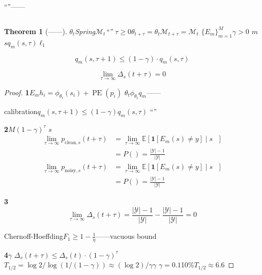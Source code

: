 \documentclass[11pt,a4paper]{article}
\newtheorem{theorem}{Theorem}[section]
\theoremstyle{remark}
\DeclareMathOperator{\PE}{PE}
\newcommand{\Y}{\mathcal{Y}}
\newcommand{\E}{\mathbb{E}}
\begin{document}
``''——


\subsection{}

\begin{theorem}[——]
\label{thm:economy}
$\theta_t$Spring$\mathcal{M}_t$``''
$\tau \geq 0$$\theta_{t+\tau} = \theta_t$$\mathcal{M}_{t+\tau} = \mathcal{M}_t$
$\{E_m\}_{m=1}^M$\textbf{}$\gamma > 0$
$m$$s$$q_m(s, \tau)$$\ell_1$

\begin{equation}
    q_m(s, \tau+1) \leq (1 - \gamma) \cdot q_m(s, \tau)
\end{equation}

\begin{equation}
    \boxed{
    \lim_{\tau \to \infty} \Delta_s(t + \tau) = 0
    }
\end{equation}
\end{theorem}

\begin{proof}
\textbf{1}$E_m$$h_i = \phi_{\theta_t}(s_i) + \PE(p_i)$
$\theta_t$$\phi_{\theta_t}$$q_m$——

calibration$q_m(s, \tau+1) \leq (1-\gamma)q_m(s,\tau)$
``''

\textbf{2}$M$$(1-\gamma)^\tau$
\textbf{}$s$
\begin{align}
    \lim_{\tau \to \infty} p_{\text{clean},s}(t+\tau)
    &= \lim_{\tau \to \infty} \E[\mathbf{1}[E_m(s) \neq y] \mid s \text{ }] \nonumber\\
    &= P(\text{}) = \frac{|\Y| - 1}{|\Y|}\\
    \lim_{\tau \to \infty} p_{\text{noisy},s}(t+\tau)
    &= \lim_{\tau \to \infty} \E[\mathbf{1}[E_m(s) \neq y] \mid s \text{ }] \nonumber\\
    &= P(\text{}) = \frac{|\Y| - 1}{|\Y|}
\end{align}

\textbf{3}
\begin{equation}
    \lim_{\tau \to \infty} \Delta_s(t+\tau)
    = \frac{|\Y| - 1}{|\Y|} - \frac{|\Y| - 1}{|\Y|} = 0
\end{equation}

Chernoff-Hoeffding$F_1 \geq 1 - \frac{1}{\eta}$——vacuous bound


\textbf{4$\gamma$}
$\Delta_s(t+\tau) \leq \Delta_s(t) \cdot (1-\gamma)^\tau$
$T_{1/2} = \log 2 / \log(1/(1-\gamma)) \approx (\log 2)/\gamma$$\gamma$
$\gamma = 0.1$10\%$T_{1/2} \approx 6.6$
\end{proof}
\end{document}
